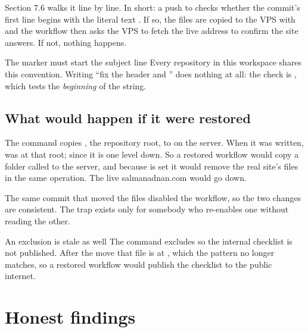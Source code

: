 \documentclass[11pt,a4paper]{article}
\begin{document}
Section 7.6 walks it line by line. In short: a push to  checks whether
the commit's first line begins with the literal text \code{[deploy]}. If so, the
files are copied to the VPS with  and the workflow then asks the VPS to
fetch the live address to confirm the site answers. If not, nothing happens.

\begin{keyidea}{The \code{[deploy]} marker must start the subject line}
Every repository in this workspace shares this convention. Writing ``fix the header
and \code{[deploy]}'' does nothing at all: the check is
, which tests the \emph{beginning} of the string.
\end{keyidea}

\subsection{What would happen if it were restored}

The  command copies , the repository root, to
 on the server. When it was written,
 was at that root; since  it is one level down. So
a restored workflow would copy a folder called  to the
server, and because  is set it would remove the real site's files
in the same operation. The live salmanadnan.com would go down.

The same commit that moved the files disabled the workflow, so the two changes are
consistent. The trap exists only for somebody who re-enables one without reading
the other.

\begin{honest}{An exclusion is stale as well}
The  command excludes  so the internal
checklist is not published. After the move that file is at
, which the pattern no longer matches,
so a restored workflow would publish the checklist to the public internet.
\end{honest}

\section{Honest findings}
\end{document}
